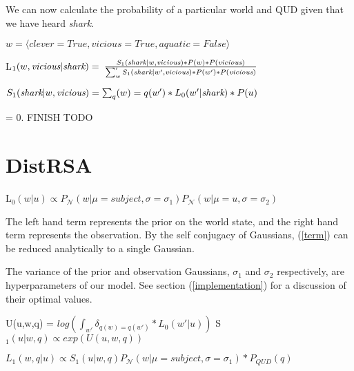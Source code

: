 \documentclass[10pt,letterpaper,twocolumn]{article}
\begin{document}
We can now calculate the probability of a particular world and QUD given that we have heard \emph{shark}. 

$w = \langle clever=True,vicious=True,aquatic=False \rangle$

L$_1(w,\emph{vicious} \vert \emph{shark}) = $ 
	$ \frac{S_1(\emph{shark}\vert w, \emph{vicious}) * P(w) * P(\emph{vicious})}{\sum_w' S_1(\emph{shark}\vert w', \emph{vicious}) * P(w') * P(\emph{vicious})}$

$S_1(\emph{shark}\vert w, \emph{vicious}) = \sum_q(w)=q(w')*L_0(w'\vert \emph{shark})*P(u) $


= 0. FINISH TODO



 

\section{DistRSA}


\begin{exe}
\ex L$_0(w\vert u) \propto P_{\mathcal{N}}(w\vert\mu=subject,\sigma=\sigma_1)P_{\mathcal{N}}(w\vert\mu=u,\sigma=\sigma_2)$ \label{term}
\end{exe}
The left hand term represents the prior on the world state, and the right hand term represents the observation. By the self conjugacy of Gaussians, (\ref{term}) can be reduced analytically to a single Gaussian.

The variance of the prior and observation Gaussians, $\sigma_1$ and $\sigma_2$ respectively, are hyperparameters of our model. See section (\ref{implementation}) for a discussion of their optimal values.



\begin{exe}
\ex U(u,w,q) = $log(\int_{w'} \delta_{q(w)=q(w')} * L_0(w'\vert u))$
\ex S$_1(u\vert w,q) \propto exp(U(u,w,q))$
\end{exe}





\begin{exe}
\ex $L_1(w,q\vert u) \propto S_1(u\vert w,q) P_{\mathcal{N}}(w\vert\mu=subject,\sigma=\sigma_1)*P_{QUD}(q)$
\end{exe}
\end{document}
